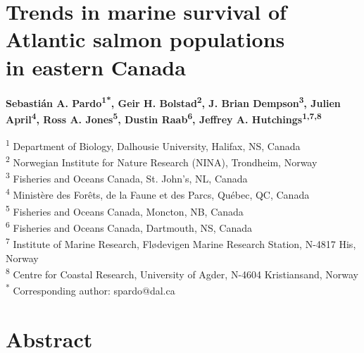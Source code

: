 \documentclass[12pt]{article}
\begin{document}
\linenumbers


\section*{Trends in marine survival of Atlantic salmon populations \\ in eastern Canada}

\textbf{Sebasti\'{a}n A. Pardo\textsuperscript{1*},
        Geir H. Bolstad\textsuperscript{2},
        J. Brian Dempson\textsuperscript{3},
        Julien April\textsuperscript{4},
        Ross A. Jones\textsuperscript{5},
        Dustin Raab\textsuperscript{6},
Jeffrey A. Hutchings\textsuperscript{1,7,8}}

\noindent\small{\textsuperscript{1} Department of Biology, Dalhousie University, Halifax, NS, Canada\\}
\small{\textsuperscript{2} Norwegian Institute for Nature Research (NINA), Trondheim, Norway\\}
\small{\textsuperscript{3} Fisheries and Oceans Canada, St. John's, NL, Canada\\}
\small{\textsuperscript{4} Minist\`{e}re des For\^{e}ts, de la Faune et des Parcs, Qu\'{e}bec, QC, Canada\\}
\small{\textsuperscript{5} Fisheries and Oceans Canada, Moncton, NB, Canada\\}
\small{\textsuperscript{6} Fisheries and Oceans Canada, Dartmouth, NS, Canada\\}
\small{\textsuperscript{7} Institute of Marine Research, Flødevigen Marine Research Station, N-4817 His, Norway\\}
\small{\textsuperscript{8} Centre for Coastal Research, University of Agder, N-4604 Kristiansand, Norway\\}
\small{\textsuperscript{*} Corresponding author: spardo@dal.ca}

\section*{Abstract}
\end{document}
